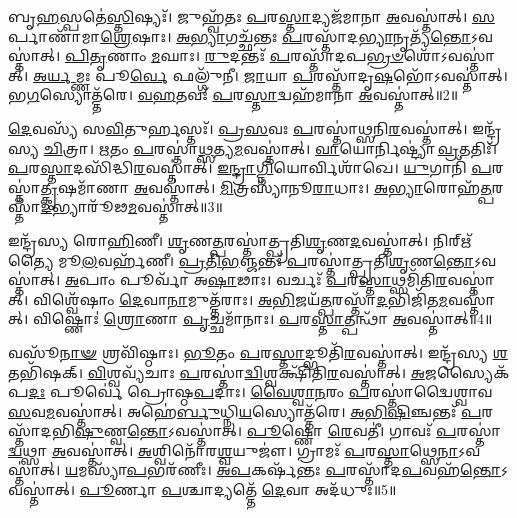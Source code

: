 𑌬𑍃\-\ul{𑌹}\-𑌸𑍍𑌪𑌤𑍇॑\-\ul{𑌸𑍍𑌤𑌿}\-𑌷𑍍𑌯𑌃᳴।
𑌜𑍁𑌹𑍍𑌵᳴𑌤𑌃 \ul{𑌪}\-𑌰\-\ul{𑌸𑍍𑌤𑌾}\-𑌦𑍍𑌯𑌜᳴𑌮𑌾𑌨𑌾 \ul{𑌅}\-𑌵𑌸𑍍𑌤𑌾॑𑌤𑍍।
\-\ul{𑌸}\-𑌰𑍍𑌪𑌾𑌣𑌾᳴𑌮𑌾\-\ul{𑌶𑍍𑌰𑍇}\-𑌷𑌾𑌃।
\-\ul{𑌅}\-\-\ul{𑌭𑍍𑌯𑌾}\-𑌗𑌚𑍍𑌛᳴𑌨𑍍𑌤𑌃 \ul{𑌪}\-𑌰𑌸𑍍𑌤𑌾᳴𑌦\-\ul{𑌭𑍍𑌯𑌾}\-𑌨𑍃𑌤𑍍𑌯᳴\-\ul{𑌨𑍍𑌤𑍋}\-\-𑌽𑌵𑌸𑍍𑌤𑌾॑𑌤𑍍।
\-\ul{𑌪𑌿}\-\-\ul{𑌤𑍃}\-𑌣𑌾𑌂 \ul{𑌮}\-𑌘𑌾𑌃।
\-\ul{𑌰𑍁}\-𑌦𑌨𑍍𑌤𑌃᳴ \ul{𑌪}\-𑌰𑌸𑍍𑌤𑌾᳴𑌦𑌪\-\ul{𑌭𑍍𑌰}\-\-\ul{𑍞}\-𑌶𑍋᳴\-𑌽𑌵𑌸𑍍𑌤𑌾॑𑌤𑍍।
\-\ul{𑌅}\-\-\ul{𑌰𑍍𑌯}\-𑌮𑍍𑌣𑌃 𑌪𑍂\-\ul{𑌰𑍍𑌵𑍇} 𑌫𑌲𑍍𑌗𑍁᳴𑌨𑍀।
\-\ul{𑌜𑌾}\-𑌯𑌾 \ul{𑌪}\-𑌰𑌸𑍍𑌤𑌾᳴𑌦𑍃\-\ul{𑌷}\-𑌭𑍋᳴\-𑌽𑌵𑌸𑍍𑌤𑌾॑𑌤𑍍।
𑌭\-\ul{𑌗}\-𑌸𑍍𑌯𑍋𑌤𑍍𑌤᳴𑌰𑍇।
\-\ul{𑌵}\-\-\ul{𑌹}\-𑌤𑌵𑌃᳴ \ul{𑌪}\-𑌰\-\ul{𑌸𑍍𑌤𑌾}\-𑌦𑍍𑌵𑌹᳴𑌮𑌾𑌨𑌾 \ul{𑌅}\-𑌵𑌸𑍍𑌤𑌾॑𑌤𑍍॥2॥

\-\ul{𑌦𑍇}\-𑌵𑌸𑍍𑌯᳴ 𑌸\-\ul{𑌵𑌿}\-𑌤𑍁𑌰𑍍\mbox{}𑌹𑌸𑍍𑌤𑌃᳴।
\-\ul{𑌪𑍍𑌰}\-\-\ul{𑌸}\-𑌵𑌃 \ul{𑌪}\-𑌰𑌸𑍍𑌤𑌾॑\-\ul{𑌥𑍍𑌸}\-𑌨𑌿\-\ul{𑌰}\-𑌵𑌸𑍍𑌤𑌾॑𑌤𑍍।
𑌇𑌨𑍍𑌦𑍍𑌰᳴𑌸𑍍𑌯 \ul{𑌚𑌿}\-𑌤𑍍𑌰𑌾।
\-\ul{𑌋}\-𑌤𑌂 \ul{𑌪}\-𑌰𑌸𑍍𑌤𑌾॑\-\ul{𑌥𑍍𑌸}\-𑌤𑍍𑌯\-\ul{𑌮}\-𑌵𑌸𑍍𑌤𑌾॑𑌤𑍍।
\-\ul{𑌵𑌾}\-𑌯𑍋𑌰𑍍𑌨𑌿𑌷𑍍𑌟𑍍𑌯𑌾॑ \ul{𑌵𑍍𑌰}\-𑌤𑌤𑌿𑌃᳴।
\-\ul{𑌪}\-𑌰\-\ul{𑌸𑍍𑌤𑌾}\-𑌦𑌸𑌿᳴𑌦𑍍𑌧𑌿\-\ul{𑌰}\-𑌵𑌸𑍍𑌤𑌾॑𑌤𑍍।
\-\ul{𑌇}\-\-\ul{𑌨𑍍𑌦𑍍𑌰𑌾}\-\-\ul{𑌗𑍍𑌨𑌿}\-𑌯𑍋𑌰𑍍𑌵𑌿𑌶𑌾᳴𑌖𑍇।
\-\ul{𑌯𑍁}\-𑌗𑌾𑌨𑌿᳴ \ul{𑌪}\-𑌰𑌸𑍍𑌤𑌾॑\-\ul{𑌤𑍍𑌕𑍃}\-𑌷𑌮𑌾᳴𑌣𑌾 \ul{𑌅}\-𑌵𑌸𑍍𑌤𑌾॑𑌤𑍍।
\-\ul{𑌮𑌿}\-𑌤𑍍𑌰𑌸𑍍𑌯𑌾᳴𑌨𑍂\-\ul{𑌰𑌾}\-𑌧𑌾𑌃।
\-\ul{𑌅}\-\-\ul{𑌭𑍍𑌯𑌾}\-𑌰𑍋𑌹᳴\-\ul{𑌤𑍍𑌪}\-𑌰𑌸𑍍𑌤𑌾᳴\-\-\ul{𑌦}\-𑌭𑍍𑌯𑌾𑌰𑍂᳴𑌢\-\ul{𑌮}\-𑌵𑌸𑍍𑌤𑌾॑𑌤𑍍॥3॥

𑌇𑌨𑍍𑌦𑍍𑌰᳴𑌸𑍍𑌯 𑌰𑍋\-\ul{𑌹𑌿}\-𑌣𑍀।
\-\ul{𑌶𑍃}\-𑌣\-\ul{𑌤𑍍𑌪}\-𑌰𑌸𑍍𑌤𑌾॑𑌤𑍍𑌪𑍍𑌰𑌤𑌿\-\ul{𑌶𑍃}\-𑌣\-\ul{𑌦}\-𑌵𑌸𑍍𑌤𑌾॑𑌤𑍍।
𑌨𑌿𑌰𑍍\mbox{}𑌋᳴𑌤𑍍𑌯𑍈 𑌮𑍂\-\ul{𑌲}\-𑌵𑌰𑍍\mbox{}𑌹᳴𑌣𑍀।
\-\ul{𑌪𑍍𑌰}\-\-\ul{𑌤𑌿}\-\-\ul{𑌭}\-𑌞𑍍𑌜𑌨𑍍𑌤𑌃᳴ \ul{𑌪}\-𑌰𑌸𑍍𑌤𑌾॑𑌤𑍍𑌪𑍍𑌰𑌤𑌿\-\ul{𑌶𑍃}\-𑌣\-\ul{𑌨𑍍𑌤𑍋}\-\-𑌽𑌵𑌸𑍍𑌤𑌾॑𑌤𑍍।
\-\ul{𑌅}\-𑌪𑌾𑌂 𑌪𑍂𑌰𑍍𑌵𑌾᳴ 𑌅\-\ul{𑌷𑌾}\-𑌢𑌾𑌃।
𑌵𑌰𑍍𑌚𑌃᳴ \ul{𑌪}\-𑌰\-\ul{𑌸𑍍𑌤𑌾}\-𑌥𑍍𑌸𑌮𑌿᳴𑌤𑌿\-\ul{𑌰}\-𑌵𑌸𑍍𑌤𑌾॑𑌤𑍍।
𑌵𑌿𑌶𑍍𑌵𑍇᳴𑌷𑌾𑌂 \ul{𑌦𑍇}\-𑌵𑌾\-\ul{𑌨𑌾}\-𑌮𑍁𑌤𑍍𑌤᳴𑌰𑌾𑌃।
\-\ul{𑌅}\-\-\ul{𑌭𑌿}\-𑌜𑌯᳴\-\ul{𑌤𑍍𑌪}\-𑌰𑌸𑍍𑌤𑌾᳴\-\ul{𑌦}\-𑌭𑌿𑌜𑌿᳴𑌤\-\ul{𑌮}\-𑌵𑌸𑍍𑌤𑌾॑𑌤𑍍।
𑌵𑌿𑌷𑍍𑌣𑍋𑌃॑ \ul{𑌶𑍍𑌰𑍋}\-𑌣𑌾 \ul{𑌪𑍃}\-𑌚𑍍𑌛𑌮𑌾᳴𑌨𑌾𑌃।
\-\ul{𑌪}\-𑌰\-\ul{𑌸𑍍𑌤𑌾}\-𑌤𑍍𑌪𑌨𑍍𑌥𑌾᳴ \ul{𑌅}\-𑌵𑌸𑍍𑌤𑌾॑𑌤𑍍॥4॥

𑌵𑌸𑍂᳴\-\ul{𑌨𑌾}\-\-\ul{𑍟} 𑌶𑍍𑌰𑌵𑌿᳴𑌷𑍍𑌠𑌾𑌃।
\-\ul{𑌭𑍂}\-𑌤𑌂 \ul{𑌪}\-𑌰\-\ul{𑌸𑍍𑌤𑌾}\-𑌦𑍍𑌭𑍂𑌤𑌿᳴\-\ul{𑌰}\-𑌵𑌸𑍍𑌤𑌾॑𑌤𑍍।
𑌇𑌨𑍍𑌦𑍍𑌰᳴𑌸𑍍𑌯 \ul{𑌶}\-𑌤𑌭𑌿᳴𑌷𑌕𑍍।
\-\ul{𑌵𑌿}\-𑌶𑍍𑌵𑌵𑍍𑌯᳴𑌚𑌾𑌃 \ul{𑌪}\-𑌰𑌸𑍍𑌤𑌾॑\-\ul{𑌦𑍍𑌵𑌿}\-𑌶𑍍𑌵𑌕𑍍𑌷𑌿᳴𑌤𑌿\-\ul{𑌰}\-𑌵𑌸𑍍𑌤𑌾॑𑌤𑍍।
\-\ul{𑌅}\-𑌜𑌸𑍍𑌯𑍈𑌕᳴𑌪\-\ul{𑌦𑌃} 𑌪𑍂𑌰𑍍𑌵𑍇॑ 𑌪𑍍𑌰𑍋𑌷𑍍𑌠\-\ul{𑌪}\-𑌦𑌾𑌃।
\-\ul{𑌵𑍈}\-\-\ul{𑌶𑍍𑌵𑌾}\-\-\ul{𑌨}\-𑌰𑌂 \ul{𑌪}\-𑌰𑌸𑍍𑌤𑌾॑𑌦𑍍𑌵𑍈𑌶𑍍𑌵𑌾𑌵\-\ul{𑌸}\-𑌵\-\ul{𑌮}\-\-𑌵𑌸𑍍𑌤𑌾॑𑌤𑍍।
𑌅𑌹𑍇॑\-\ul{𑌰𑍍𑌬𑍁}\-𑌧𑍍𑌨𑌿\-\ul{𑌯}\-𑌸𑍍𑌯𑍋\-𑌤𑍍𑌤᳴𑌰𑍇।
\-\ul{𑌅}\-\-\ul{𑌭𑌿}\-\-\ul{𑌷𑌿}\-𑌞𑍍𑌚𑌨𑍍𑌤𑌃᳴ \ul{𑌪}\-𑌰𑌸𑍍𑌤𑌾᳴𑌦𑌭𑌿\-\-\ul{𑌷𑍁}\-𑌣𑍍𑌵\-\ul{𑌨𑍍𑌤𑍋}\-\-𑌽𑌵𑌸𑍍𑌤𑌾॑𑌤𑍍।
\-\ul{𑌪𑍂}\-𑌷𑍍𑌣𑍋 \ul{𑌰𑍇}\-𑌵𑌤𑍀॑।
𑌗𑌾𑌵𑌃᳴ \ul{𑌪}\-𑌰𑌸𑍍𑌤𑌾॑\-\ul{𑌦𑍍𑌵}\-𑌥𑍍𑌸𑌾 \ul{𑌅}\-𑌵𑌸𑍍𑌤𑌾॑𑌤𑍍।
\-\ul{𑌅}\-𑌶𑍍𑌵𑌿𑌨𑍋᳴𑌰\-\ul{𑌶𑍍𑌵}\-𑌯𑍁𑌜𑍗॑।
𑌗𑍍𑌰𑌾𑌮𑌃᳴ \ul{𑌪}\-𑌰\-\ul{𑌸𑍍𑌤𑌾}\-𑌥𑍍𑌸𑍇\-\ul{𑌨𑌾}\-\-𑌽𑌵𑌸𑍍𑌤𑌾॑𑌤𑍍।
\-\ul{𑌯}\-𑌮𑌸𑍍𑌯𑌾᳴\-\ul{𑌪}\-𑌭𑌰᳴𑌣𑍀𑌃।
\-\ul{𑌅}\-\-\ul{𑌪}\-𑌕𑌰𑍍\mbox{}𑌷᳴𑌨𑍍𑌤𑌃 \ul{𑌪}\-𑌰𑌸𑍍𑌤𑌾᳴𑌦\-\ul{𑌪}\-𑌵𑌹᳴\-\ul{𑌨𑍍𑌤𑍋}\-\-𑌽𑌵𑌸𑍍𑌤𑌾॑𑌤𑍍।
\-\ul{𑌪𑍂}\-𑌰𑍍𑌣𑌾 \ul{𑌪}\-𑌶𑍍𑌚𑌾𑌦𑍍𑌯𑌤𑍍𑌤𑍇᳴ \ul{𑌦𑍇}\-𑌵𑌾 𑌅𑌦᳴𑌧𑍁𑌃॥5॥\anuvakamend[\-\ul{𑌆}\-𑌰𑍍𑌦𑍍𑌰\-\ul{𑌮}\-𑌵\-\ul{𑌸𑍍𑌤𑌾}\-𑌦𑍍𑌵𑌹᳴𑌮𑌾𑌨𑌾 \ul{𑌅}\-𑌵𑌸𑍍𑌤𑌾᳴\-\ul{𑌦}\-𑌭𑍍𑌯𑌾𑌰𑍂᳴𑌢\-\ul{𑌮}\-𑌵\-\ul{𑌸𑍍𑌤𑌾}\-𑌤𑍍𑌪𑌨𑍍𑌥𑌾᳴ \ul{𑌅}\-𑌵𑌸𑍍𑌤𑌾॑\-\ul{𑌦𑍍𑌵}\-𑌥𑍍𑌸𑌾 \ul{𑌅}\-𑌵\-\ul{𑌸𑍍𑌤𑌾}\-𑌤𑍍𑌪𑌞𑍍𑌚᳴ 𑌚]

